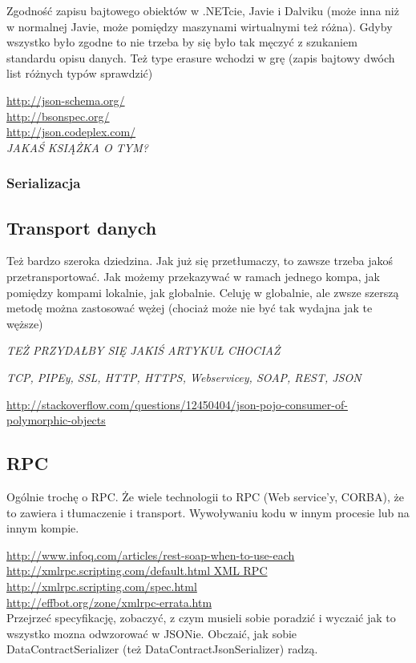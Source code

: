 \documentclass[twoside,a4paper]{book}
\begin{document}
Zgodność zapisu bajtowego obiektów w .NETcie, Javie i Dalviku (może inna niż w normalnej Javie, może pomiędzy maszynami wirtualnymi też różna). Gdyby wszystko było zgodne to nie trzeba by się było tak męczyć z szukaniem standardu opisu danych. Też type erasure wchodzi w grę (zapis bajtowy dwóch list różnych typów sprawdzić)

\url{http://json-schema.org/}\\
\url{http://bsonspec.org/}\\
\url{http://json.codeplex.com/}\\

\emph{JAKAŚ KSIĄŻKA O TYM?}

\subsubsection{Serializacja}

\subsection{Transport danych}
Też bardzo szeroka dziedzina. Jak już się przetłumaczy, to zawsze trzeba jakoś przetransportować. Jak możemy przekazywać w ramach jednego kompa, jak pomiędzy kompami lokalnie, jak globalnie.
Celuję w globalnie, ale zwsze szerszą metodę można zastosować wężej (chociaż może nie być tak wydajna jak te węższe)

\emph{TEŻ PRZYDAŁBY SIĘ JAKIŚ ARTYKUŁ CHOCIAŻ}

\emph{TCP, PIPEy, SSL, HTTP, HTTPS, Webservicey, SOAP, REST, JSON}

\url{http://stackoverflow.com/questions/12450404/json-pojo-consumer-of-polymorphic-objects}

\subsection{RPC}
Ogólnie trochę o RPC. Że wiele technologii to RPC (Web service'y, CORBA), że to zawiera i tłumaczenie i transport.
Wywoływaniu kodu w innym procesie lub na innym kompie.

\url{http://www.infoq.com/articles/rest-soap-when-to-use-each}\\

\url{http://xmlrpc.scripting.com/default.html XML RPC}\\
\url{http://xmlrpc.scripting.com/spec.html}\\
\url{http://effbot.org/zone/xmlrpc-errata.htm}\\
Przejrzeć specyfikację, zobaczyć, z czym musieli sobie poradzić i wyczaić jak to wszystko mozna odwzorować w JSONie. Obczaić, jak sobie DataContractSerializer (też DataContractJsonSerializer) radzą. 
\end{document}
